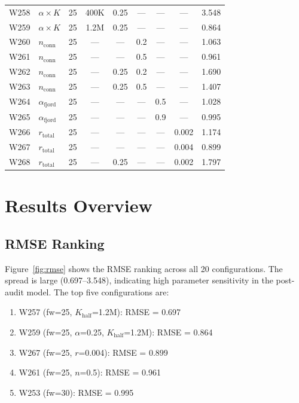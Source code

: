 \documentclass[11pt,a4paper]{article}
\begin{document}
\begin{table}[H]
\begin{tabular}{@{}llccccccr@{}}
W258 & $\alpha \times K$ & 25 & 400K & 0.25 & --- & --- & --- & 3.548 \\
\rowcolor{lightgray}
W259 & $\alpha \times K$ & 25 & 1.2M & 0.25 & --- & --- & --- & 0.864 \\
W260 & $n_{\text{conn}}$ & 25 & --- & --- & 0.2 & --- & --- & 1.063 \\
\rowcolor{lightgray}
W261 & $n_{\text{conn}}$ & 25 & --- & --- & 0.5 & --- & --- & 0.961 \\
W262 & $n_{\text{conn}}$ & 25 & --- & 0.25 & 0.2 & --- & --- & 1.690 \\
\rowcolor{lightgray}
W263 & $n_{\text{conn}}$ & 25 & --- & 0.25 & 0.5 & --- & --- & 1.407 \\
W264 & $\alpha_{\text{fjord}}$ & 25 & --- & --- & --- & 0.5 & --- & 1.028 \\
\rowcolor{lightgray}
W265 & $\alpha_{\text{fjord}}$ & 25 & --- & --- & --- & 0.9 & --- & 0.995 \\
W266 & $r_{\text{total}}$ & 25 & --- & --- & --- & --- & 0.002 & 1.174 \\
\rowcolor{lightgray}
W267 & $r_{\text{total}}$ & 25 & --- & --- & --- & --- & 0.004 & 0.899 \\
W268 & $r_{\text{total}}$ & 25 & --- & 0.25 & --- & --- & 0.002 & 1.797 \\
\bottomrule
\end{tabular}
\end{table}

\section{Results Overview}

\subsection{RMSE Ranking}

Figure~\ref{fig:rmse} shows the RMSE ranking across all 20 configurations. The spread is large (0.697--3.548), indicating high parameter sensitivity in the post-audit model. The top five configurations are:

\begin{enumerate}
    \item W257 (fw=25, $K_{\text{half}}$=1.2M): RMSE = 0.697
    \item W259 (fw=25, $\alpha$=0.25, $K_{\text{half}}$=1.2M): RMSE = 0.864
    \item W267 (fw=25, $r$=0.004): RMSE = 0.899
    \item W261 (fw=25, $n$=0.5): RMSE = 0.961
    \item W253 (fw=30): RMSE = 0.995
\end{enumerate}
\end{document}
